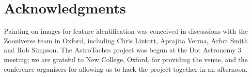 \documentclass[useAMS,usenatbib]{mn2e}
\begin{document}

\section*{Acknowledgments} 

Painting on images for feature identification 
was conceived in discussions with the Zooniverse team in Oxford,
including Chris Lintott, Aprajita Verma, Arfon Smith and Rob Simpson. The
AstroTaches project was begun at the Dot Astronomy 3 meeting; we are grateful
to New College, Oxford, for providing the venue, and the conference organisers
for allowing us to hack the project together in an afternoon. 
%

\label{lastpage}

% 





\bsp
\end{document}
